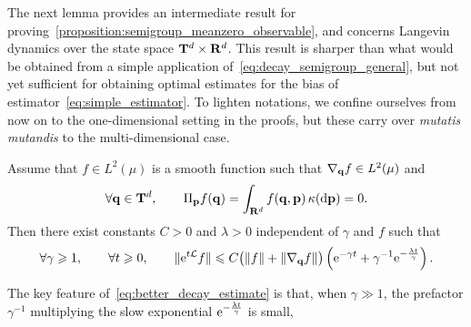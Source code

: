 \documentclass[11pt,a4paper]{article}
\begin{document}

The next lemma provides an intermediate result for proving~\cref{proposition:semigroup_meanzero_observable},
and concerns Langevin dynamics over the state space $\mathbf T^d \times \mathbf R^d$.
This result is sharper than what would be obtained from a simple application of~\eqref{eq:decay_semigroup_general},
but not yet sufficient for obtaining optimal estimates for the bias of estimator~\eqref{eq:simple_estimator}.
To lighten notations,
we confine ourselves from now on to the one-dimensional setting in the proofs,
but these carry over \emph{mutatis mutandis} to the multi-dimensional case.
\begin{lemma}
    \label{lemma:initial_lemma}
    Assume that $f \in L^2(\mu)$ is a smooth function such that $\nabla_{\boldsymbol{\mathbf q}} f \in L^2(\mu)$ and
    \begin{equation}
        \label{eq:assumption_f}
        \forall \boldsymbol{\mathbf q} \in \mathbf T^d, \qquad
        \Pi_{\boldsymbol{\mathbf p}} f(\boldsymbol{\mathbf q}) = \int_{\mathbf R^d} f(\boldsymbol{\mathbf q}, \boldsymbol{\mathbf p}) \, \kappa(\mathrm d \boldsymbol{\mathbf p}) = 0.
    \end{equation}
    Then there exist constants $C > 0$ and $\lambda > 0$ independent of $\gamma$ and $f$ such that
    \begin{align}
        \label{eq:better_decay_estimate}
        \forall \gamma \geq 1, \qquad
        \forall t \geq 0, \qquad
        \norm*{\e^{t\mathcal L} f}
        \leq C \bigl( \norm{f} + \norm{\grad_{\vect q} f} \bigr)
        \left( \e^{- \gamma t} + \gamma^{-1} \e^{-\frac{\lambda t}{\gamma}} \right).
    \end{align}
\end{lemma}
The key feature of~\eqref{eq:better_decay_estimate} is that,
when $\gamma \gg 1$,
the prefactor $\gamma^{-1}$ multiplying the slow exponential $\mathrm{e}^{-\frac{\lambda t}{\gamma}}$ is small,
\end{document}
